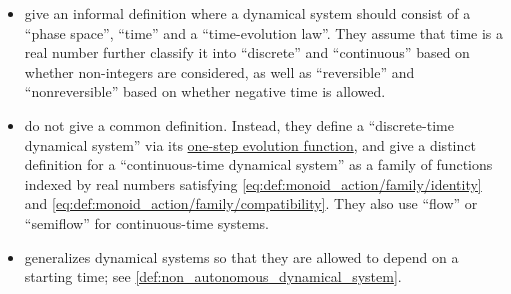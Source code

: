 \begin{remark}
\begin{itemize}
    \item \Textcite[1]{HasselblattKatok1995DynamicalSystems} give an informal definition where a dynamical system should consist of a \enquote{phase space}, \enquote{time} and a \enquote{time-evolution law}. They assume that time is a real number further classify it into \enquote{discrete} and \enquote{continuous} based on whether non-integers are considered, as well as \enquote{reversible} and \enquote{nonreversible} based on whether negative time is allowed.

    \item \Textcite[2]{BrinStuck2002DynamicalSystems} do not give a common definition. Instead, they define a \enquote{discrete-time dynamical system} via its \hyperref[def:one_step_evolution_function]{one-step evolution function}, and give a distinct definition for a \enquote{continuous-time dynamical system} as a family of functions indexed by real numbers satisfying \ref{eq:def:monoid_action/family/identity} and \ref{eq:def:monoid_action/family/compatibility}. They also use \enquote{flow} or \enquote{semiflow} for continuous-time systems.

    \item \Textcite[18]{Müller2022HandbookOfDynamicsAndProbability} generalizes dynamical systems so that they are allowed to depend on a starting time; see \cref{def:non_autonomous_dynamical_system}.
  \end{itemize}
\end{remark}

